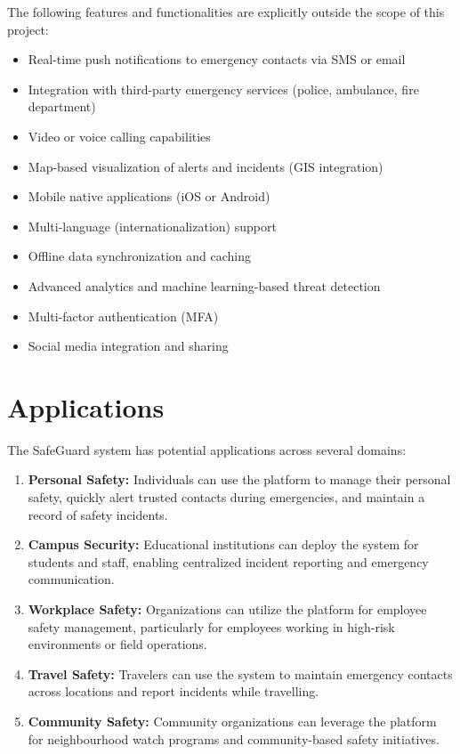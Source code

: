 The following features and functionalities are explicitly outside the scope of this project:

\begin{itemize}
  \item Real-time push notifications to emergency contacts via SMS or email
  \item Integration with third-party emergency services (police, ambulance, fire department)
  \item Video or voice calling capabilities
  \item Map-based visualization of alerts and incidents (GIS integration)
  \item Mobile native applications (iOS or Android)
  \item Multi-language (internationalization) support
  \item Offline data synchronization and caching
  \item Advanced analytics and machine learning-based threat detection
  \item Multi-factor authentication (MFA)
  \item Social media integration and sharing
\end{itemize}

\section{Applications}

The SafeGuard system has potential applications across several domains:

\begin{enumerate}[label=\arabic*.]
  \item \textbf{Personal Safety:} Individuals can use the platform to manage their personal safety, quickly alert trusted contacts during emergencies, and maintain a record of safety incidents.

  \item \textbf{Campus Security:} Educational institutions can deploy the system for students and staff, enabling centralized incident reporting and emergency communication.

  \item \textbf{Workplace Safety:} Organizations can utilize the platform for employee safety management, particularly for employees working in high-risk environments or field operations.

  \item \textbf{Travel Safety:} Travelers can use the system to maintain emergency contacts across locations and report incidents while travelling.

  \item \textbf{Community Safety:} Community organizations can leverage the platform for neighbourhood watch programs and community-based safety initiatives.
\end{enumerate}

